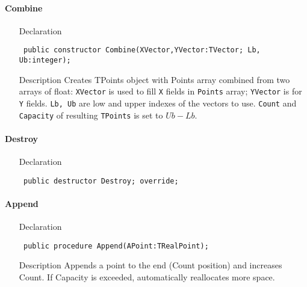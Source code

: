 \documentclass[12pt,a4paper,oneside]{report}
\newcommand{\declarationitem}[1]{{\addfontfeatures{FakeBold=1.3} #1}}
\newcommand{\descriptiontitle}[1]{{\addfontfeatures{FakeSlant}#1}}
\newcommand{\code}[1]{\texttt{#1}}
\begin{document}
\paragraph{Combine}\hspace*{\fill}
\label{lmPointsVec.TPoints-Combine}
\begin{itemize}\item[\declarationitem{Declaration}\hfill]
	\begin{flushleft}
		\code{
			public constructor Combine(XVector,YVector:TVector; Lb, Ub:integer);}
	\end{flushleft}
	\item[\descriptiontitle{Description}]
	Creates TPoints object with Points array combined from two arrays of float: \code{XVector} is used to fill \code{X} fields in \code{Points} array; \code{YVector} is for \code{Y} fields. \code{Lb, Ub} are low and upper indexes of the vectors to use. \code{Count} and \code{Capacity} of resulting \code{TPoints} is set to $Ub-Lb$. 
\end{itemize}
\paragraph{Destroy}\hspace*{\fill}

\label{lmPointsVec.TPoints-Destroy}
\begin{itemize}\item[\declarationitem{Declaration}\hfill]
	\begin{flushleft}
		\code{
			public destructor Destroy; override;}
	\end{flushleft}
\end{itemize}
\paragraph{Append}\hspace*{\fill}
\label{lmPointsVec.TPoints-Append}
\begin{itemize}\item[\declarationitem{Declaration}\hfill]
	\begin{flushleft}
		\code{
			public procedure Append(APoint:TRealPoint);}
		
	\end{flushleft}
	
	\par
	\item[\descriptiontitle{Description}]
	Appends a point to the end (Count position) and increases Count. If Capacity is exceeded, automatically reallocates more space.
	
\end{itemize}
\end{document}
